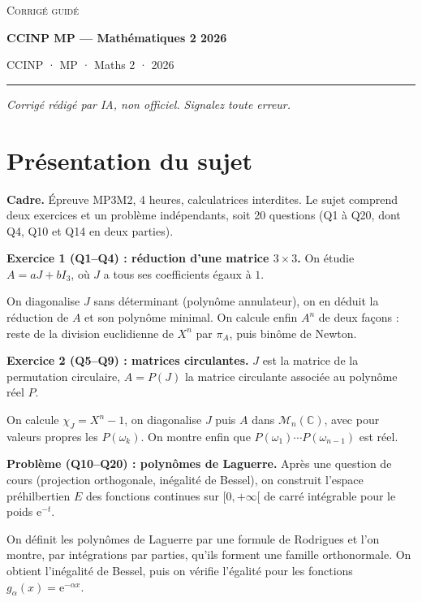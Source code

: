 \documentclass[11pt,a4paper]{article}
\begin{document}
\thispagestyle{plain}
\begin{center}
  {\small\scshape Corrigé guidé}\par\smallskip
  {\LARGE\bfseries CCINP MP — Mathématiques 2 2026\par}\medskip
  {\large CCINP · MP · Maths 2 · 2026\par}
\end{center}
\vspace{2pt}\hrule\vspace{8pt}

\emph{Corrigé rédigé par IA, non officiel. Signalez toute erreur.}

\hypertarget{pruxe9sentation-du-sujet}{%
\section{Présentation du sujet}\label{pruxe9sentation-du-sujet}}

\textbf{Cadre.} Épreuve MP3M2, 4 heures, calculatrices interdites. Le sujet comprend deux exercices et un problème indépendants, soit 20 questions (Q1 à Q20, dont Q4, Q10 et Q14 en deux parties).

\textbf{Exercice 1 (Q1--Q4) : réduction d'une matrice \(3\times3\).} On étudie \(A=aJ+bI_3\), où \(J\) a tous ses coefficients égaux à \(1\).

On diagonalise \(J\) sans déterminant (polynôme annulateur), on en déduit la réduction de \(A\) et son polynôme minimal. On calcule enfin \(A^n\) de deux façons : reste de la division euclidienne de \(X^n\) par \(\pi_A\), puis binôme de Newton.

\textbf{Exercice 2 (Q5--Q9) : matrices circulantes.} \(J\) est la matrice de la permutation circulaire, \(A=P(J)\) la matrice circulante associée au polynôme réel \(P\).

On calcule \(\chi_J=X^n-1\), on diagonalise \(J\) puis \(A\) dans \(\mathcal M_n(\mathbb C)\), avec pour valeurs propres les \(P(\omega_k)\). On montre enfin que \(P(\omega_1)\cdots P(\omega_{n-1})\) est réel.

\textbf{Problème (Q10--Q20) : polynômes de Laguerre.} Après une question de cours (projection orthogonale, inégalité de Bessel), on construit l'espace préhilbertien \(E\) des fonctions continues sur \([0,+\infty[\) de carré intégrable pour le poids \(\mathrm e^{-t}\).

On définit les polynômes de Laguerre par une formule de Rodrigues et l'on montre, par intégrations par parties, qu'ils forment une famille orthonormale. On obtient l'inégalité de Bessel, puis on vérifie l'égalité pour les fonctions \(g_\alpha(x)=\mathrm e^{-\alpha x}\).
\end{document}
